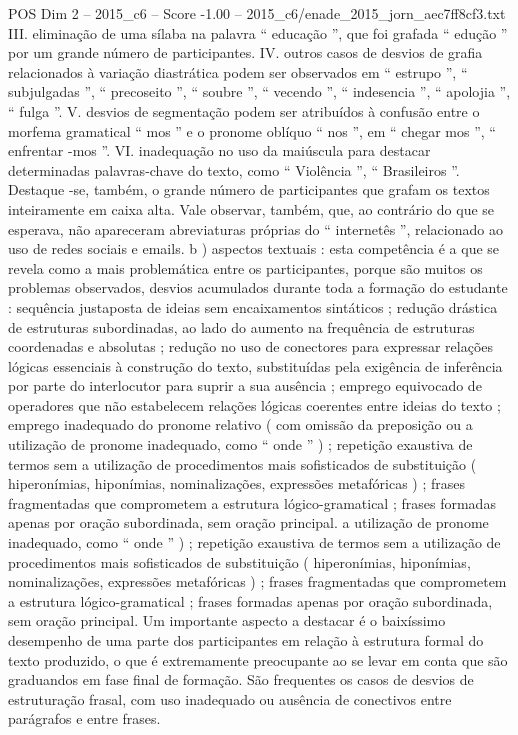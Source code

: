\begin{textsample}{POS Dim 2 – 2015\_c6 – Score -1.00 – 2015\_c6/enade\_2015\_jorn\_aec7ff8cf3.txt}
III. eliminação de uma sílaba na palavra “ educação ”, que foi grafada “ edução ” por um grande número de participantes.
IV. outros casos de desvios de grafia relacionados à variação diastrática podem ser observados em “ estrupo ”, “ subjulgadas ”, “ precoseito ”, “ soubre ”, “ vecendo ”, “ indesencia ”, “ apolojia ”, “ fulga ”.
V. desvios de segmentação podem ser atribuídos à confusão entre o morfema gramatical “ mos ” e o pronome oblíquo “ nos ”, em “ chegar mos ”, “ enfrentar -mos ”.
VI. inadequação no uso da maiúscula para destacar determinadas palavras-chave do texto, como “ Violência ”, “ Brasileiros ”.
Destaque -se, também, o grande número de participantes que grafam os textos inteiramente em caixa alta.
Vale observar, também, que, ao contrário do que se esperava, não apareceram abreviaturas próprias do “ internetês ”, relacionado ao uso de redes sociais e emails. b ) aspectos textuais : esta competência é a que se revela como a mais problemática entre os participantes, porque são muitos os problemas observados, desvios acumulados durante toda a formação do estudante : sequência justaposta de ideias sem encaixamentos sintáticos ; redução drástica de estruturas subordinadas, ao lado do aumento na frequência de estruturas coordenadas e absolutas ; redução no uso de conectores para expressar relações lógicas essenciais à construção do texto, substituídas pela exigência de inferência por parte do interlocutor para suprir a sua ausência ; emprego equivocado de operadores que não estabelecem relações lógicas coerentes entre ideias do texto ; emprego inadequado do pronome relativo ( com omissão da preposição ou a utilização de pronome inadequado, como “ onde ” ) ; repetição exaustiva de termos sem a utilização de procedimentos mais sofisticados de substituição ( hiperonímias, hiponímias, nominalizações, expressões metafóricas ) ; frases fragmentadas que comprometem a estrutura lógico-gramatical ; frases formadas apenas por oração subordinada, sem oração principal. a utilização de pronome inadequado, como “ onde ” ) ; repetição exaustiva de termos sem a utilização de procedimentos mais sofisticados de substituição ( hiperonímias, hiponímias, nominalizações, expressões metafóricas ) ; frases fragmentadas que comprometem a estrutura lógico-gramatical ; frases formadas apenas por oração subordinada, sem oração principal.
Um importante aspecto a destacar é o baixíssimo desempenho de uma parte dos participantes em relação à estrutura formal do texto produzido, o que é extremamente preocupante ao se levar em conta que são graduandos em fase final de formação.
São frequentes os casos de desvios de estruturação frasal, com uso inadequado ou ausência de conectivos entre parágrafos e entre frases.

\end{textsample}

